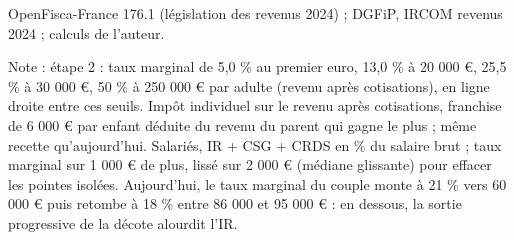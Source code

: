 OpenFisca-France 176.1 (législation des revenus 2024) ; DGFiP, IRCOM revenus 2024 ; calculs de l'auteur.\par Note : étape 2 : taux marginal de 5,0 \% au premier euro, 13,0 \% à 20 000 \euro{}, 25,5 \% à 30 000 \euro{}, 50 \% à 250 000 \euro{} par adulte (revenu après cotisations), en ligne droite entre ces seuils. Impôt individuel sur le revenu après cotisations, franchise de 6 000 \euro{} par enfant déduite du revenu du parent qui gagne le plus ; même recette qu'aujourd'hui. Salariés, IR + CSG + CRDS en \% du salaire brut ; taux marginal sur 1 000 \euro{} de plus, lissé sur 2 000 \euro{} (médiane glissante) pour effacer les pointes isolées. Aujourd'hui, le taux marginal du couple monte à 21 \% vers 60 000 \euro{} puis retombe à 18 \% entre 86 000 et 95 000 \euro{} : en dessous, la sortie progressive de la décote alourdit l'IR.
